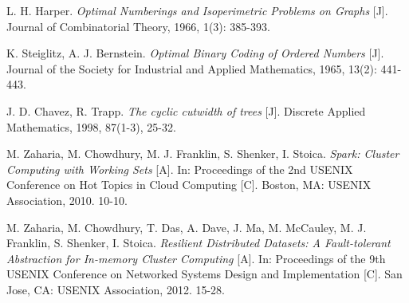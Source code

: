\begin{thebibliography}{99}
	L. H. Harper.
	\emph{Optimal Numberings and Isoperimetric Problems on Graphs} [J].
	Journal of Combinatorial Theory, 1966, 1(3): 385-393.

	K. Steiglitz, A. J. Bernstein.
	\emph{Optimal Binary Coding of Ordered Numbers} [J].
	Journal of the Society for Industrial and Applied Mathematics,
	1965, 13(2): 441-443.

	J. D. Chavez, R. Trapp.
	\emph{The cyclic cutwidth of trees} [J].
	Discrete Applied Mathematics, 1998, 87(1-3), 25-32.

	M. Zaharia, M. Chowdhury, M. J. Franklin, S. Shenker, I. Stoica.
	\emph{Spark: Cluster Computing with Working Sets} [A].
	In: Proceedings of the 2nd USENIX Conference on Hot Topics in Cloud Computing [C].
	Boston, MA: USENIX Association, 2010. 10-10.

	M. Zaharia, M. Chowdhury, T. Das, A. Dave, J. Ma,
	M. McCauley, M. J. Franklin, S. Shenker, I. Stoica.
	\emph{Resilient Distributed Datasets: A Fault-tolerant Abstraction for
	In-memory Cluster Computing} [A].
	In: Proceedings of the 9th USENIX Conference on Networked Systems Design and Implementation [C].
	San Jose, CA: USENIX Association, 2012. 15-28.

\end{thebibliography}

